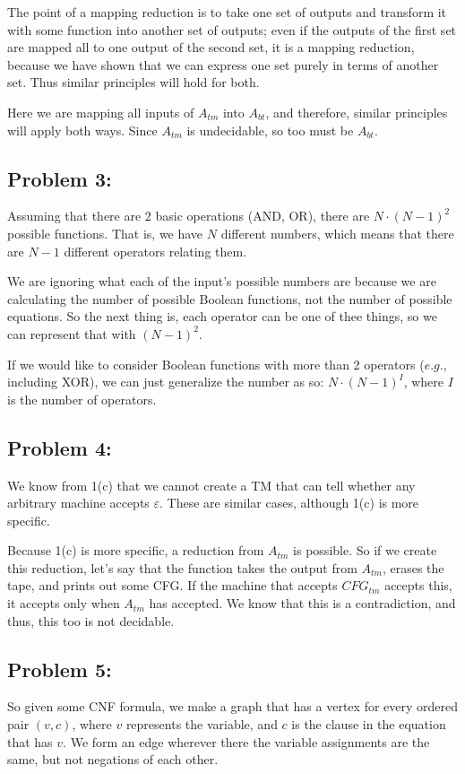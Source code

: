 \documentclass[a4paper]{article}
\begin{document}
The point of a mapping reduction is to take one set of outputs and transform it with some function into another set of outputs; even if the outputs of the first set are mapped all to one output of the second set, it is a mapping reduction, because we have shown that we can express one set purely in terms of another set. Thus similar principles will hold for both.

Here we are mapping all inputs of $A_{tm}$ into $A_{bt}$, and therefore, similar principles will apply both ways. Since $A_{tm}$ is undecidable, so too must be $A_{bt}$.


\subsection*{Problem 3:}

Assuming that there are 2 basic operations (AND, OR), there are $N \cdot (N-1)^2$ possible functions. That is, we have $N$ different numbers, which means that there are $N-1$ different operators relating them.

We are ignoring what each of the input's possible numbers are because we are calculating the number of possible Boolean functions, not the number of possible equations. So the next thing is, each operator can be one of thee things, so we can represent that with $(N-1)^2$.

If we would like to consider Boolean functions with more than 2 operators ($\textit{e.g.}$, including XOR), we can just generalize the number as so: $N \cdot (N-1)^I$, where $I$ is the number of operators.

\subsection*{Problem 4:}

We know from 1(c) that we cannot create a TM that can tell whether any arbitrary machine accepts $\varepsilon$. These are similar cases, although 1(c) is more specific.

Because 1(c) is more specific, a reduction from $A_{tm}$ is possible. So if we create this reduction, let's say that the function takes the output from $A_{tm}$, erases the tape, and prints out some CFG. If the machine that accepts $CFG_{tm}$ accepts this, it accepts only when $A_{tm}$ has accepted. We know that this is a contradiction, and thus, this too is not decidable.

\subsection*{Problem 5:} So given some CNF formula, we make a graph that has a vertex for every ordered pair $(v,c)$, where $v$ represents the variable, and $c$ is the clause in the equation that has $v$. We form an edge wherever there the variable assignments are the same, but not negations of each other.
\end{document}
